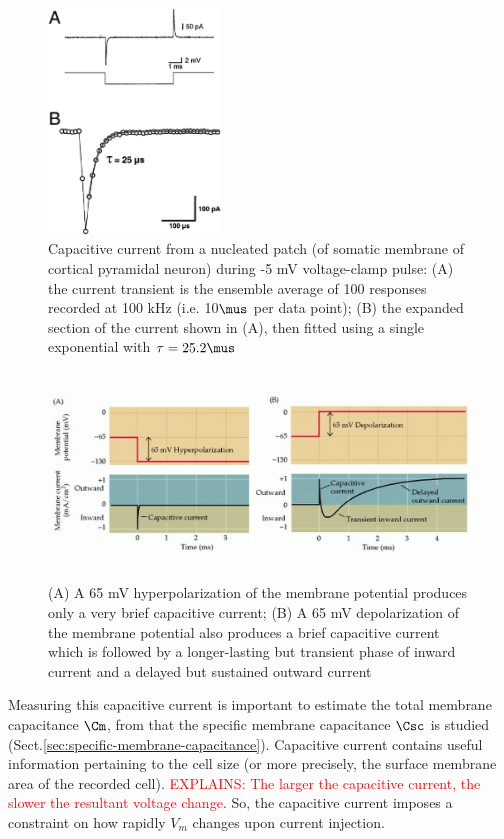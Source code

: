 \begin{figure}[htbp]
\centerline{\includegraphics[height=6cm]{./images/capacitive-current-gentet2008.eps}}
\caption{Capacitive current from a
nucleated patch (of somatic membrane of cortical pyramidal neuron) during -5 mV
voltage-clamp pulse: (A) the current transient is the ensemble average of 100
responses recorded at 100 kHz (i.e. 10$\mus$ per data point); (B) the expanded
section of the current shown in (A),
then fitted using a single exponential
with $\tau = 25.2 \mus$ \citep{gentet2008}}
\label{fig:capacitive-current-gentet2008}
\end{figure}

\begin{figure}[hbtp]
  \centerline{\includegraphics[height=5.5cm,
    angle=0]{./images/capacitive-current.eps}}
\caption{(A) A 65 mV hyperpolarization of the membrane potential produces only a
very brief capacitive current; (B) A 65 mV depolarization of the membrane
potential also produces a brief capacitive current which is followed by a
longer-lasting but transient phase of inward current and a delayed but sustained
outward current}
\label{fig:capacitive-current}
\end{figure}

Measuring this capacitive current is important to estimate the total membrane
capacitance $\Cm$, from that the specific membrane capacitance $\Csc$ is studied
(Sect.\ref{sec:specific-membrane-capacitance}).
Capacitive current contains useful information pertaining to the cell size (or
more precisely, the surface membrane area of the recorded cell).
\textcolor{red}{EXPLAINS: The larger the capacitive current, the slower the
resultant voltage change}. So, the capacitive current imposes a constraint on
how rapidly $V_m$ changes upon current injection.

